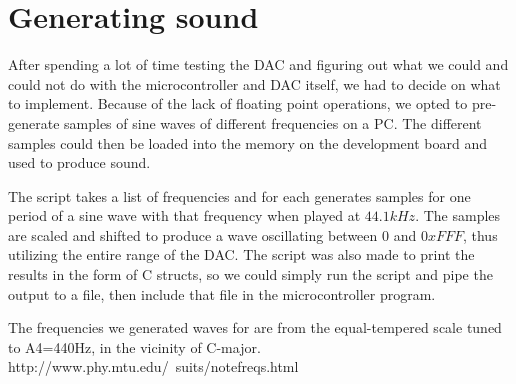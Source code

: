 \section{Generating sound}

After spending a lot of time testing the DAC and figuring out what we could and could not do with the microcontroller and DAC itself, we had to decide on what to implement. Because of the lack of floating point operations, we opted to pre-generate samples of sine waves of different frequencies on a PC. The different samples could then be loaded into the memory on the development board and used to produce sound.

The script takes a list of frequencies and for each generates samples for one period of a sine wave with that frequency when played at $44.1kHz$. The samples are scaled and shifted to produce a wave oscillating between $0$ and $0xFFF$, thus utilizing the entire range of the DAC. The script was also made to print the results in the form of C structs, so we could simply run the script and pipe the output to a file, then include that file in the microcontroller program.

The frequencies we generated waves for are from the equal-tempered scale tuned to A4=440Hz, in the vicinity of C-major.
http://www.phy.mtu.edu/~suits/notefreqs.html
